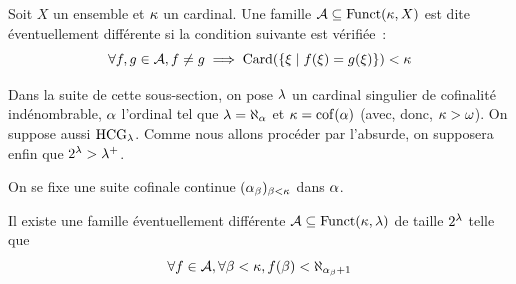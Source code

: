 \begin{definition}
  Soit $X$ un ensemble et $\kappa$ un cardinal. Une famille
  $\mathcal A\subseteq\operatorname{Funct}(\kappa,X)$ est dite éventuellement différente si
  la condition suivante est vérifiée~:
  \[\forall f,g \in \mathcal A, f \neq g \implies
  \operatorname{Card}(\left\{ \xi \;\middle\vert\; f(\xi) = g(\xi) \right\}) < \kappa\]
\end{definition}

\begin{notation}
  Dans la suite de cette sous-section, on pose $\lambda$ un cardinal singulier
  de cofinalité indénombrable, $\alpha$ l'ordinal tel que
  $\lambda = \aleph_\alpha$ et $\kappa = \operatorname{cof}(\alpha)$ (avec, donc,
  $\kappa > \omega$). On suppose aussi $\operatorname{HCG}_\lambda$.
  Comme nous allons procéder par l'absurde, on supposera enfin que
  $2^\lambda > \lambda^{+}$.
\end{notation}

On se fixe une suite cofinale continue $(\alpha_{\beta})_{\beta < \kappa}$ dans
$\alpha$.

\begin{proposition}
  Il existe une famille éventuellement différente
  $\mathcal A\subseteq\operatorname{Funct}(\kappa,\lambda)$ de taille $2^\lambda$ telle que
  \[\forall f\in\mathcal A, \forall \beta < \kappa,
  f(\beta) < \aleph_{\alpha_\beta + 1}\]
\end{proposition}


